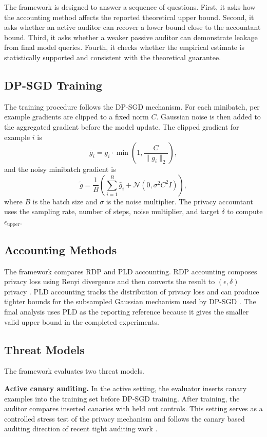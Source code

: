 \documentclass{article}
\begin{document}
The framework is designed to answer a sequence of questions. First, it asks how the accounting method affects the reported theoretical upper bound. Second, it asks whether an active auditor can recover a lower bound close to the accountant bound. Third, it asks whether a weaker passive auditor can demonstrate leakage from final model queries. Fourth, it checks whether the empirical estimate is statistically supported and consistent with the theoretical guarantee.

\subsection{DP-SGD Training}
The training procedure follows the DP-SGD mechanism. For each minibatch, per example gradients are clipped to a fixed norm $C$. Gaussian noise is then added to the aggregated gradient before the model update. The clipped gradient for example $i$ is
\[
\bar{g}_i =
g_i \cdot \min\left(1, \frac{C}{\|g_i\|_2}\right),
\]
and the noisy minibatch gradient is
\[
\tilde{g}
=
\frac{1}{B}
\left(
\sum_{i=1}^{B} \bar{g}_i
+
\mathcal{N}(0,\sigma^2 C^2 I)
\right),
\]
where $B$ is the batch size and $\sigma$ is the noise multiplier. The privacy accountant uses the sampling rate, number of steps, noise multiplier, and target $\delta$ to compute $\epsilon_{\mathrm{upper}}$.

\subsection{Accounting Methods}
The framework compares RDP and PLD accounting. RDP accounting composes privacy loss using Renyi divergence and then converts the result to $(\epsilon,\delta)$ privacy \citep{mironov2017renyi}. PLD accounting tracks the distribution of privacy loss and can produce tighter bounds for the subsampled Gaussian mechanism used by DP-SGD \citep{koskela2020computing,gopi2021numerical}. The final analysis uses PLD as the reporting reference because it gives the smaller valid upper bound in the completed experiments.

\subsection{Threat Models}
The framework evaluates two threat models.

\textbf{Active canary auditing.}
In the active setting, the evaluator inserts canary examples into the training set before DP-SGD training. After training, the auditor compares inserted canaries with held out controls. This setting serves as a controlled stress test of the privacy mechanism and follows the canary based auditing direction of recent tight auditing work \citep{nasr2023tight,steinke2023privacy}.
\end{document}
